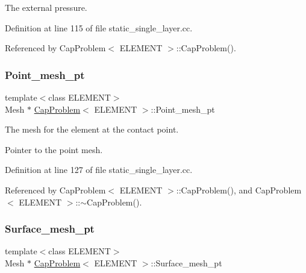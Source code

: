 The external pressure. 



Definition at line 115 of file static\+\_\+single\+\_\+layer.\+cc.



Referenced by Cap\+Problem$<$ E\+L\+E\+M\+E\+N\+T $>$\+::\+Cap\+Problem().

\mbox{\label{classCapProblem_ac889ff4b3a1297ee3848ee78d549e914}} 
\subsubsection{\texorpdfstring{Point\+\_\+mesh\+\_\+pt}{Point\_mesh\_pt}}
{\footnotesize\ttfamily template$<$class E\+L\+E\+M\+E\+NT$>$ \\
Mesh $\ast$ \hyperlink{classCapProblem}{Cap\+Problem}$<$ E\+L\+E\+M\+E\+NT $>$\+::Point\+\_\+mesh\+\_\+pt\hspace{0.3cm}{\ttfamily [private]}}



The mesh for the element at the contact point. 

Pointer to the point mesh. 

Definition at line 127 of file static\+\_\+single\+\_\+layer.\+cc.



Referenced by Cap\+Problem$<$ E\+L\+E\+M\+E\+N\+T $>$\+::\+Cap\+Problem(), and Cap\+Problem$<$ E\+L\+E\+M\+E\+N\+T $>$\+::$\sim$\+Cap\+Problem().

\mbox{\label{classCapProblem_a1ebf7016d766c5de59d2a479e0733c69}} 
\subsubsection{\texorpdfstring{Surface\+\_\+mesh\+\_\+pt}{Surface\_mesh\_pt}}
{\footnotesize\ttfamily template$<$class E\+L\+E\+M\+E\+NT$>$ \\
Mesh $\ast$ \hyperlink{classCapProblem}{Cap\+Problem}$<$ E\+L\+E\+M\+E\+NT $>$\+::Surface\+\_\+mesh\+\_\+pt\hspace{0.3cm}{\ttfamily [private]}}



